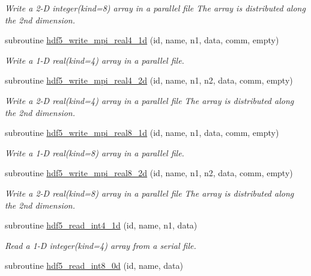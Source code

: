 \begin{DoxyCompactItemize}
\begin{DoxyCompactList}\small\item\em Write a 2-\/\-D integer(kind=8) array in a parallel file The array is distributed along the 2nd dimension. \end{DoxyCompactList}\item 
subroutine \hyperlink{classmodhdf5_aa5b200799b385418068f6c916bbbad34}{hdf5\-\_\-write\-\_\-mpi\-\_\-real4\-\_\-1d} (id, name, n1, data, comm, empty)
\begin{DoxyCompactList}\small\item\em Write a 1-\/\-D real(kind=4) array in a parallel file. \end{DoxyCompactList}\item 
subroutine \hyperlink{classmodhdf5_a6c880adf75b8b8a5ad56120effed2f6a}{hdf5\-\_\-write\-\_\-mpi\-\_\-real4\-\_\-2d} (id, name, n1, n2, data, comm, empty)
\begin{DoxyCompactList}\small\item\em Write a 2-\/\-D real(kind=4) array in a parallel file The array is distributed along the 2nd dimension. \end{DoxyCompactList}\item 
subroutine \hyperlink{classmodhdf5_a6fe25705d9c64cf43c06c885a71878e2}{hdf5\-\_\-write\-\_\-mpi\-\_\-real8\-\_\-1d} (id, name, n1, data, comm, empty)
\begin{DoxyCompactList}\small\item\em Write a 1-\/\-D real(kind=8) array in a parallel file. \end{DoxyCompactList}\item 
subroutine \hyperlink{classmodhdf5_a670313739a46ec4d9006d8761d35157a}{hdf5\-\_\-write\-\_\-mpi\-\_\-real8\-\_\-2d} (id, name, n1, n2, data, comm, empty)
\begin{DoxyCompactList}\small\item\em Write a 2-\/\-D real(kind=8) array in a parallel file The array is distributed along the 2nd dimension. \end{DoxyCompactList}\item 
subroutine \hyperlink{classmodhdf5_afda2e44922def0d140ce850c12ef2f48}{hdf5\-\_\-read\-\_\-int4\-\_\-1d} (id, name, n1, data)
\begin{DoxyCompactList}\small\item\em Read a 1-\/\-D integer(kind=4) array from a serial file. \end{DoxyCompactList}\item 
subroutine \hyperlink{classmodhdf5_ac60e719f8d357b8ffab4f183a7ca4603}{hdf5\-\_\-read\-\_\-int8\-\_\-0d} (id, name, data)

\end{DoxyCompactItemize}

